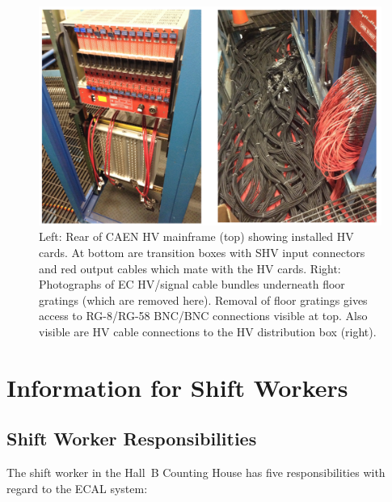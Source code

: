 \documentclass[letterpaper,10pt]{article}
\begin{document}
\begin{figure}[htbp]
  \centering
  \includegraphics[width= 5in, keepaspectratio = true]{Cable-routing}
  \vspace{2mm}
  \caption{Left: Rear of CAEN HV mainframe (top) showing installed HV cards.  At bottom are transition boxes with SHV input connectors and red output cables which mate with the HV cards.  Right: Photographs of EC HV/signal cable bundles underneath floor gratings (which are removed here). Removal of floor gratings gives access to RG-8/RG-58 BNC/BNC connections visible at top.  Also visible are HV cable connections to the HV distribution box (right).}
  \label{fc-layout-3} 
\end{figure}



\clearpage

\vfil
\eject


\section{Information for Shift Workers}

\subsection{Shift Worker Responsibilities}

The shift worker in the Hall~B Counting House has five responsibilities with regard to the ECAL
system:
\end{document}
